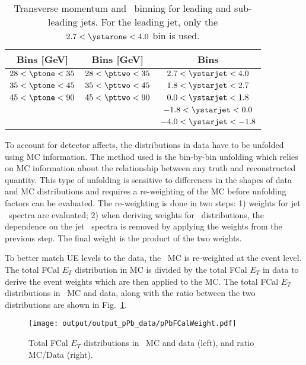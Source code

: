 \begin{table}[h]
	\centering
	\begin{tabular}{|| c | c | c || } 
		\hline
		\ptone Bins [GeV] & \pttwo Bins [GeV] & \ystartwo Bins \\ 
		\hline
		$28<\ptone<35$   & $28<\pttwo<35$  & $2.7<\ystarjet<4.0$ \\ 
		$35<\ptone<45$   & $35<\pttwo<45$  & $1.8<\ystarjet<2.7$ \\ 
		$45<\ptone<90$   & $45<\pttwo<90$  & $0.0<\ystarjet<1.8$ \\
						 & 				   & $-1.8<\ystarjet<0.0$ \\
						 &				   & $-4.0<\ystarjet<-1.8$ \\
		\hline
	\end{tabular}
	\caption{\label{tab:binning} Transverse momentum and \ystar\ binning for leading and sub-leading jets. For the leading jet, only the $2.7<\ystarone<4.0$ bin is used. }
\end{table}

To account for detector affects, the distributions in data have to be unfolded using MC information. The method used is the bin-by-bin unfolding which relies on MC information about the relationship between any truth and reconstructed quantity. This type of unfolding is sensitive to differences in the shapes of data and MC distributions and requires a re-weighting of the MC before unfolding factors can be evaluated. The re-weighting is done in two steps: 1) weights for jet \pt\ spectra are evaluated; 2) when deriving weights for \conetwo\ distributions, the dependence on the jet \pt\ spectra is removed by applying the weights from the previous step. The final weight is the product of the two weights.

To better match UE levels to the data, the \pPb\ MC is re-weighted at the event level. The total FCal $E_{T}$ distribution in MC is divided by the total FCal $E_{T}$ in data to derive the event weights which are then applied to the MC. The total FCal $E_{T}$ distributions in \pPb\ MC and data, along with the ratio between the two distributions are shown in Fig.~\ref{fig:fcalet}. 

\begin{figure}
	\centering
	\texttt{[image: output/output\_pPb\_data/pPbFCalWeight.pdf]} 
	\caption{ Total FCal $E_{T}$ distributions in \pPb\ MC and data (left), and ratio MC/Data (right). }	
	\label{fig:fcalet}
\end{figure}


